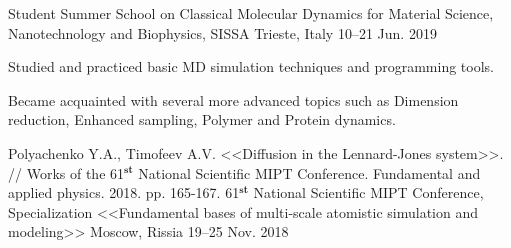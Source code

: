 \begin{cventries}
  \cventry
    {Student} %
    {Summer School on Classical Molecular Dynamics for Material Science, Nanotechnology and Biophysics, SISSA} %
    {Trieste, Italy} %
    {10--21 Jun. 2019} %
    {
      \begin{cvitems} %
        \item {Studied and practiced basic MD simulation techniques and programming tools.}
        \item {Became acquainted with several more advanced topics such as Dimension reduction, Enhanced sampling, Polymer and Protein dynamics.}
      \end{cvitems}
    }
    
    
  \cventry
    {Polyachenko Y.A., Timofeev A.V. <<Diffusion in the Lennard-Jones system>>. // Works of the 61$^{\textbf{st}}$ National Scientific MIPT Conference. Fundamental and applied physics. 2018. pp. 165-167.} %
    {61$^{\textbf{st}}$ National Scientific MIPT Conference, Specialization <<Fundamental bases of multi-scale atomistic simulation and modeling>>} %
    {Moscow, Rissia} %
    {19--25 Nov. 2018} %
    {
      \begin{cvitems} %
      \end{cvitems}
    }
    

\end{cventries}
